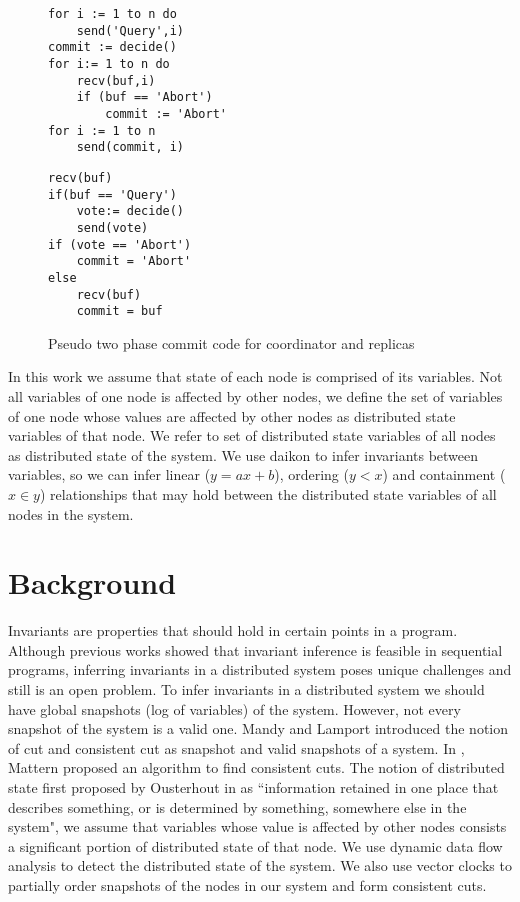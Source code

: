 \begin{figure}
\centering
\begin{lstlisting}[caption={Coordinator Code}]
for i := 1 to n do
	send('Query',i)
commit := decide()
for i:= 1 to n do
	recv(buf,i)
	if (buf == 'Abort')
		commit := 'Abort'
for i := 1 to n
	send(commit, i)
\end{lstlisting}
\begin{lstlisting}[caption={Replica Code}]
recv(buf)
if(buf == 'Query')
	vote:= decide()
	send(vote)
if (vote == 'Abort')
	commit = 'Abort'
else
	recv(buf)
	commit = buf
\end{lstlisting}
\caption{Pseudo two phase commit code for coordinator and replicas}
\label{lst:2pc}
\end{figure}

In this work we 
assume that state of each node is comprised of its variables. Not all variables of one node is affected by other nodes, we define the set of variables of one node whose values are affected by other nodes as distributed state variables of that node. We refer to set of distributed 
state variables of all nodes as distributed state of the system. We use daikon \cite{ernst2001dynamically} to infer invariants between variables, so we can infer linear ($y = ax + b$), ordering ($y < x$) and containment ($x \in y$) relationships that may hold between the distributed state variables of all nodes in the system.



\section{Background}

Invariants are properties that should hold in certain points in a program. Although previous works \cite{ernst2001dynamically} showed that invariant inference is feasible in sequential programs, inferring invariants in a distributed system poses unique challenges and still is an open problem. To infer invariants in a distributed system we should have global snapshots (log of variables) of the system. However, not every snapshot of the system is a valid one. Mandy and Lamport introduced the notion of cut and consistent cut as snapshot and valid snapshots of a system. In \cite{mattern1989virtual}, Mattern proposed an algorithm to find consistent cuts. The notion of distributed state first proposed by Ousterhout in \cite{ousterhout1991role} as ``information retained in one place that describes something, or is determined by something, somewhere else in the system", we assume that variables whose value is affected by other nodes consists a significant portion of distributed state of that node. We use dynamic data flow analysis to detect the distributed state of the system. We also use vector clocks to partially order snapshots of the nodes in our system and form consistent cuts.

